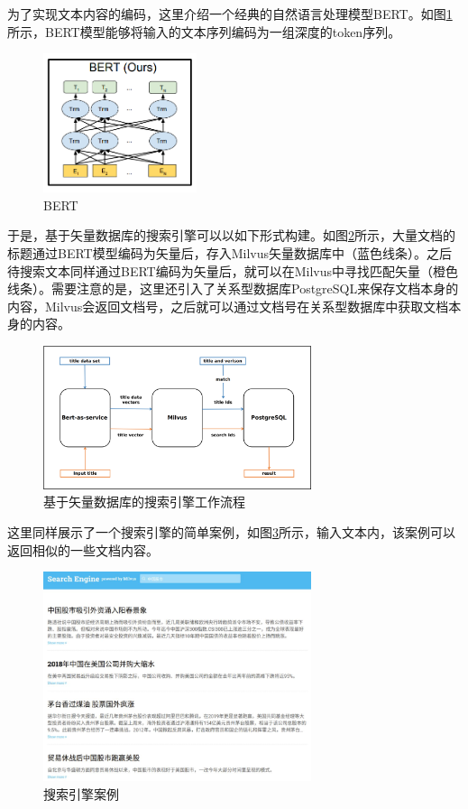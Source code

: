 为了实现文本内容的编码，这里介绍一个经典的自然语言处理模型BERT\cite{devlin2018bert}。如图\ref{fig:bert}所示，BERT模型能够将输入的文本序列编码为一组深度的token序列。

\begin{figure}[H]
    \includegraphics[width=0.4\textwidth]{examples/bert.png}
    \centering
    \caption{BERT}
    \label{fig:bert}
\end{figure}

于是，基于矢量数据库的搜索引擎可以以如下形式构建。如图\ref{fig:search_engine}所示，大量文档的标题通过BERT模型编码为矢量后，存入Milvus矢量数据库中（蓝色线条）。之后待搜索文本同样通过BERT编码为矢量后，就可以在Milvus中寻找匹配矢量（橙色线条）。需要注意的是，这里还引入了关系型数据库PostgreSQL来保存文档本身的内容，Milvus会返回文档号，之后就可以通过文档号在关系型数据库中获取文档本身的内容。

\begin{figure}[H]
    \includegraphics[width=0.7\textwidth]{examples/search engine.png}
    \centering
    \caption{基于矢量数据库的搜索引擎工作流程}
    \label{fig:search_engine}
\end{figure}

这里同样展示了一个搜索引擎的简单案例，如图\ref{fig:search_engine_demo}所示，输入文本内，该案例可以返回相似的一些文档内容。

\begin{figure}[H]
    \includegraphics[width=0.7\textwidth]{examples/search engine demo.png}
    \centering
    \caption{搜索引擎案例}
    \label{fig:search_engine_demo}
\end{figure}
